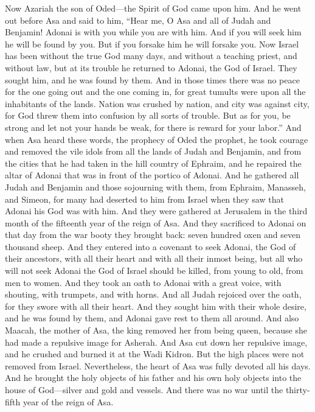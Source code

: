 \begin{biblechapter} %
 Now Azariah the son of Oded—the Spirit of God came upon him.
\verse And he went out before Asa and said to him, “Hear me, O Asa and all of Judah and Benjamin! Adonai is with you while you are with him. And if you will seek him he will be found by you. But if you forsake him he will forsake you.
\verse Now Israel has been without the true God many days, and without a teaching priest, and without law,
\verse but at its trouble he returned to Adonai, the God of Israel. They sought him, and he was found by them.
\verse And in those times there was no peace for the one going out and the one coming in, for great tumults were upon all the inhabitants of the lands.
\verse Nation was crushed by nation, and city was against city, for God threw them into confusion by all sorts of trouble.
\verse But as for you, be strong and let not your hands be weak, for there is reward for your labor.”
\verse And when Asa heard these words, the prophecy of Oded the prophet, he took courage and removed the vile idols from all the lands of Judah and Benjamin, and from the cities that he had taken in the hill country of Ephraim, and he repaired the altar of Adonai that was in front of the portico of Adonai.
\verse And he gathered all Judah and Benjamin and those sojourning with them, from Ephraim, Manasseh, and Simeon, for many had deserted to him from Israel when they saw that Adonai his God was with him.
\verse And they were gathered at Jerusalem in the third month of the fifteenth year of the reign of Asa.
\verse And they sacrificed to Adonai on that day from the war booty they brought back: seven hundred oxen and seven thousand sheep.
\verse And they entered into a covenant to seek Adonai, the God of their ancestors, with all their heart and with all their inmost being,
\verse but all who will not seek Adonai the God of Israel should be killed, from young to old, from men to women.
\verse And they took an oath to Adonai with a great voice, with shouting, with trumpets, and with horns.
\verse And all Judah rejoiced over the oath, for they swore with all their heart. And they sought him with their whole desire, and he was found by them, and Adonai gave rest to them all around.
\verse And also Maacah, the mother of Asa, the king removed her from being queen, because she had made a repulsive image for Asherah. And Asa cut down her repulsive image, and he crushed and burned it at the Wadi Kidron.
\verse But the high places were not removed from Israel. Nevertheless, the heart of Asa was fully devoted all his days.
\verse And he brought the holy objects of his father and his own holy objects into the house of God—silver and gold and vessels.
\verse And there was no war until the thirty-fifth year of the reign of Asa.
\end{biblechapter}

